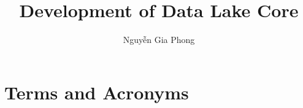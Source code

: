 \usepackage[vietnamese,english]{babel}
\usepackage{lmodern}
\usepackage{booktabs}
\usepackage{graphicx}
\usepackage{titling}
\usepackage{ccicons}
\usepackage[Bjornstrup]{fncychap}
\usepackage{hyperref}
\usepackage{enumitem}
\usepackage{siunitx}
\usepackage{listings}
\usepackage[numbib]{tocbibind}
\usepackage[acronym,section,toc]{glossaries}


\newcommand{\https}[1]{\href{https://#1}{#1}}
\newcommand{\arxiv}[1]{\href{https://arxiv.org/abs/#1}{arXiv:#1}}
\newcommand{\doi}[1]{\href{https://doi.org/#1}{doi:#1}}
\newcommand{\rfc}[1]{\doi{10.17487/rfc#1}}

\author{Nguyễn Gia Phong}
\title{Development of Data Lake Core}





\frontmatter
\setcounter{page}{1}
\pagestyle{plain}
\tableofcontents


\mainmatter
\pagestyle{headings}
\setcounter{secnumdepth}{3}
\lstset{basicstyle=\ttfamily}





\appendix


\chapter{Terms and Acronyms}\printglossaries

